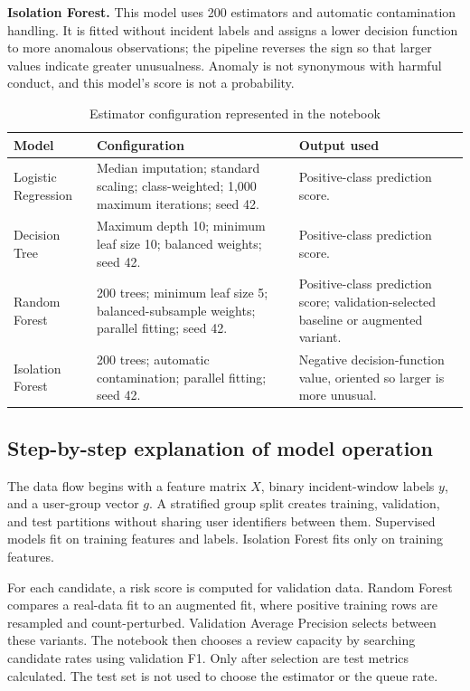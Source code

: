 \textbf{Isolation Forest.} This model uses 200 estimators and automatic
contamination handling. It is fitted without incident labels and
assigns a lower decision function to more anomalous observations; the
pipeline reverses the sign so that larger values indicate greater
unusualness. Anomaly is not synonymous with harmful conduct, and this
model's score is not a probability.

\begin{table}[H]
\centering
\tablefont
\caption{Estimator configuration represented in the notebook}
\label{tab:model-settings}
\begin{tabularx}{\textwidth}{|p{}|p{}|Y|}
\hline
\textbf{Model} & \textbf{Configuration} & \textbf{Output used}\\\hline
Logistic Regression & Median imputation; standard scaling; class-weighted; 1,000 maximum iterations; seed 42. & Positive-class prediction score.\\\hline
Decision Tree & Maximum depth 10; minimum leaf size 10; balanced weights; seed 42. & Positive-class prediction score.\\\hline
Random Forest & 200 trees; minimum leaf size 5; balanced-subsample weights; parallel fitting; seed 42. & Positive-class prediction score; validation-selected baseline or augmented variant.\\\hline
Isolation Forest & 200 trees; automatic contamination; parallel fitting; seed 42. & Negative decision-function value, oriented so larger is more unusual.\\\hline
\end{tabularx}
\end{table}

\subsection{Step-by-step explanation of model operation}
The data flow begins with a feature matrix \(X\), binary incident-window
labels \(y\), and a user-group vector \(g\). A stratified group split
creates training, validation, and test partitions without sharing user
identifiers between them. Supervised models fit on training features
and labels. Isolation Forest fits only on training features.

For each candidate, a risk score is computed for validation data.
Random Forest compares a real-data fit to an augmented fit, where
positive training rows are resampled and count-perturbed. Validation
Average Precision selects between these variants. The notebook then
chooses a review capacity by searching candidate rates using validation
F1. Only after selection are test metrics calculated. The test set is
not used to choose the estimator or the queue rate.

